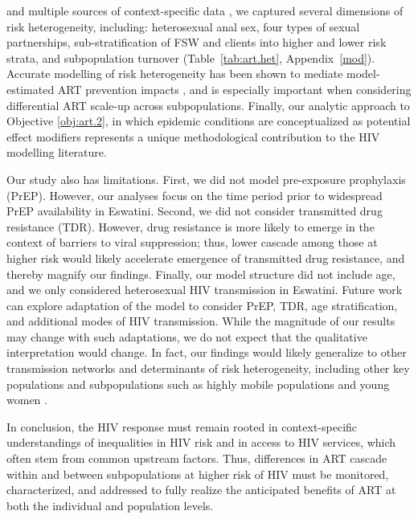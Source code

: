 and multiple sources of context-specific data
\cite{SDHS2006,SHIMS1,SHIMS2,Baral2014,EswKP2014,EswIBBS2022},
we captured several dimensions of risk heterogeneity, including:
heterosexual anal sex,
four types of sexual partnerships,
sub-stratification of FSW and clients into higher and lower risk strata,
and subpopulation turnover
(Table~\ref{tab:art.het}, Appendix~\ref{mod}).
Accurate modelling of risk heterogeneity
has been shown to mediate model-estimated ART prevention impacts \cite{Hontelez2013},
and is especially important when considering differential ART scale-up across subpopulations.
Finally, our analytic approach to Objective \ref{obj:art.2},
in which epidemic conditions are conceptualized as potential effect modifiers
represents a unique methodological contribution to the HIV modelling literature.
\par
Our study also has limitations.
First, we did not model pre-exposure prophylaxis (PrEP).
However, our analyses focus on the time period
prior to widespread PrEP availability in Eswatini.
Second, we did not consider transmitted drug resistance (TDR).
However, drug resistance is more likely to emerge
in the context of barriers to viral suppression;
thus, lower cascade among those at higher risk
would likely accelerate emergence of transmitted drug resistance,
and thereby magnify our findings.
Finally, our model structure did not include age,
and we only considered heterosexual HIV transmission in Eswatini.
Future work can explore adaptation of the model to consider
PrEP, TDR, age stratification, and additional modes of HIV transmission.
While the magnitude of our results may change with such adaptations,
we do not expect that the qualitative interpretation would change.
In fact, our findings would likely generalize
to other transmission networks and determinants of risk heterogeneity,
including other key populations and subpopulations such as
highly mobile populations and young women \cite{Camlin2019,Cheuk2020}.
\par
In conclusion, the HIV response must remain rooted in
context-specific understandings of inequalities in HIV risk and in access to HIV services,
which often stem from common upstream factors.
Thus, differences in ART cascade within and between subpopulations at higher risk of HIV
must be monitored, characterized, and addressed
to fully realize the anticipated benefits of ART
at both the individual and population levels.
\enlargethispage{2ex} %
